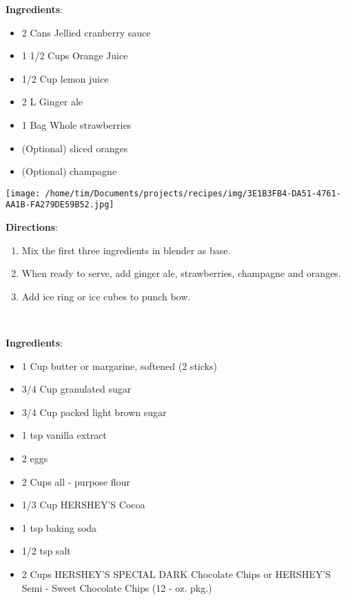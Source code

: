 \documentclass[11pt, twoside, openany]{book}
\begin{document}
\begin{minipage}[t]{0.8\linewidth}
\textbf{Ingredients}:\vspace{-3mm}
\begin{multicols}{2}
\begin{itemize}\setlength\itemsep{-1mm}
\item 2 Cans Jellied cranberry sauce
\item 1 1/2 Cups Orange Juice
\item 1/2 Cup lemon juice
\item 2 L Ginger ale
\item 1 Bag Whole strawberries
\item (Optional) sliced oranges
\item (Optional) champagne
\end{itemize}
\end{multicols}
\end{minipage}
\begin{minipage}[t]{0.2\linewidth}
\centering \strut\vspace*{-\baselineskip}\newline
\texttt{[image: /home/tim/Documents/projects/recipes/img/3E1B3FB4-DA51-4761-AA1B-FA279DE59B52.jpg]}\\
\end{minipage}\vspace{3mm}
\textbf{Directions}:
\vspace{-3mm}\begin{enumerate}\setlength\itemsep{-1mm}
\item Mix the first three ingredients in blender as base.
\item When ready to serve, add ginger ale, strawberries, champagne and oranges.
\item Add ice ring or ice cubes to punch bow.
\end{enumerate}
 \label{hershey's-"perfectly-chocolate"-cookies}\hfill\textit{}\\
\begin{minipage}[t]{0.8\linewidth}
\textbf{Ingredients}:\vspace{-3mm}
\begin{multicols}{2}
\begin{itemize}\setlength\itemsep{-1mm}
\item 1 Cup butter or margarine, softened (2 sticks)
\item 3/4 Cup granulated sugar
\item 3/4 Cup packed light brown sugar
\item 1 tsp vanilla extract
\item 2 eggs
\item 2 Cups all - purpose flour
\item 1/3 Cup HERSHEY'S Cocoa
\item 1 tsp baking soda
\item 1/2 tsp salt
\item 2 Cups HERSHEY'S SPECIAL DARK Chocolate Chips or HERSHEY'S Semi - Sweet Chocolate Chips (12 - oz. pkg.)
\end{itemize}
\end{multicols}
\end{minipage}
\end{document}

